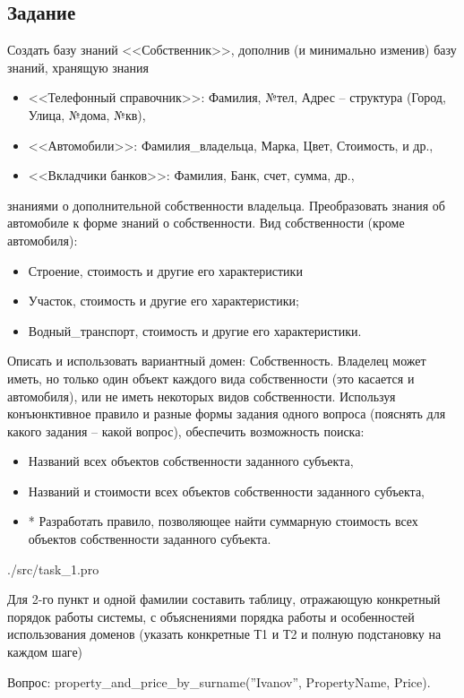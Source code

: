\subsection*{Задание}
Создать базу знаний <<Собственник>>, дополнив (и минимально изменив) базу знаний, хранящую знания
\begin{itemize}
	\item <<Телефонный справочник>>: Фамилия, №тел, Адрес – структура (Город, Улица, №дома, №кв),
	\item <<Автомобили>>: Фамилия\_владельца, Марка, Цвет, Стоимость, и др.,
	\item <<Вкладчики банков>>: Фамилия, Банк, счет, сумма, др.,
\end{itemize}
знаниями о дополнительной собственности владельца. Преобразовать знания об
автомобиле к форме знаний о собственности.
Вид собственности (кроме автомобиля):
\begin{itemize}
	\item Строение, стоимость и другие его характеристики
	\item Участок, стоимость и другие его характеристики;
	\item Водный\_транспорт, стоимость и другие его характеристики.
\end{itemize}

Описать и использовать вариантный домен: Собственность. Владелец может иметь, но
только один объект каждого вида собственности (это касается и автомобиля), или не
иметь некоторых видов собственности.
Используя конъюнктивное правило и разные формы задания одного вопроса (пояснять
для какого задания – какой вопрос),
обеспечить возможность поиска:
\begin{itemize}
	\item Названий всех объектов собственности заданного субъекта,
	\item Названий и стоимости всех объектов собственности заданного субъекта,
	\item * Разработать правило, позволяющее найти суммарную стоимость всех объектов собственности заданного субъекта.
\end{itemize}


\begin{lstinputlisting}[
	label={lst:t1},
	]{./src/task_1.pro}
\end{lstinputlisting}

Для 2-го пункт и одной фамилии составить таблицу, отражающую конкретный
порядок работы системы, с объяснениями порядка работы и особенностей использования
доменов (указать конкретные Т1 и Т2 и полную подстановку на каждом шаге)

Вопрос:  property\_and\_price\_by\_surname(''Ivanov'', PropertyName, Price).